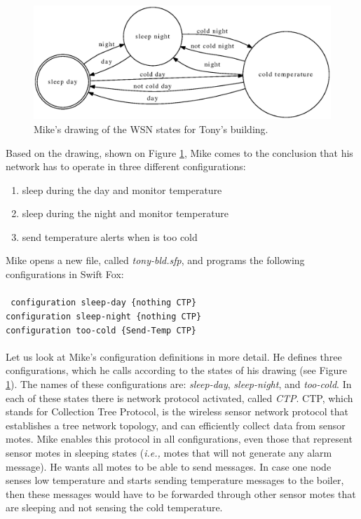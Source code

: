 \begin{figure}[htp]
\centering
	\includegraphics[scale=0.6]{fig/fsm.eps}
	\caption{Mike's drawing of the WSN states for Tony's building.}
	\label{fig:fsm}
\end{figure}

Based on the drawing, shown on Figure \ref{fig:fsm}, Mike comes to the
conclusion that his network has to operate in three different
configurations:								\\

\begin{enumerate}
	\item sleep during the day and monitor temperature
	\item sleep during the night and monitor temperature
	\item send temperature alerts when is too cold
\end{enumerate}
Mike opens a new file, called \textit{tony-bld.sfp}, and programs the 
following configurations in Swift Fox:					\\
\\
\texttt{
configuration sleep-day \{nothing CTP\}  				\\
configuration sleep-night \{nothing CTP\}				\\
configuration too-cold \{Send-Temp CTP\}				\\
}\\
Let us look at Mike's configuration definitions in more detail. He defines 
three configurations, which he calls according to the states of his drawing
(see Figure \ref{fig:fsm}). The names of these configurations are:
\textit{sleep-day}, \textit{sleep-night}, and \textit{too-cold}. In each of
these states there is network protocol activated, called \textit{CTP}. CTP,
which stands for Collection Tree Protocol, is the wireless sensor network
protocol that establishes a tree network topology, and can efficiently
collect data from sensor motes. Mike enables this protocol in all
configurations, even those that represent sensor motes in sleeping states
(\textit{i.e.,} motes that will not generate any alarm message). He wants
all motes to be able to send messages. In case one node senses low
temperature and starts sending temperature messages to the boiler, then
these messages would have to be forwarded through other sensor motes that 
are sleeping and not sensing the cold temperature. 

